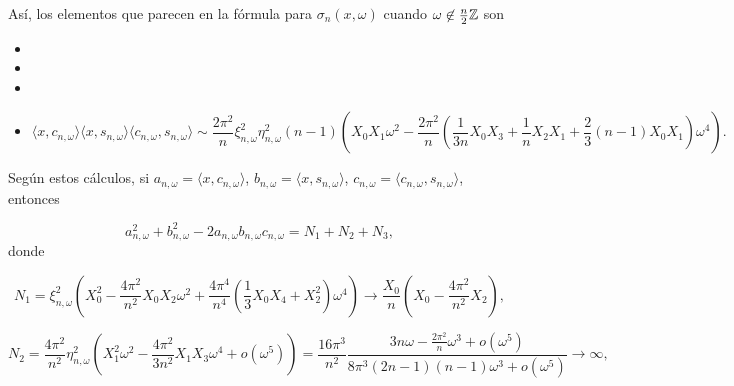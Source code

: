 \TODO{
\[
\langle x,
s_{n, \omega}
\rangle = 
\eta_{n, \omega} 
\left(
\frac{2 \pi}{n} X_{1} \omega - \frac{4 \pi^{3}}{3n^{3}}X_{3} \omega^{3} 
 + o(\omega^{5})
\right),
\]
}

Así, los elementos que parecen en la fórmula
para $\sigma_{n}(x, \omega)$ cuando $\omega \not\in \frac{n}{2} \mathbb{Z}$ son
\begin{itemize}
\item 
{}

\item
\TODO{
\[
\langle x,
c_{n, \omega}
\rangle^{2} = 
\xi_{n, \omega}^{2}
\left(
X_{0}^{2} - \frac{4 \pi^{2}}{n^{2}}X_{0}X_{2} \omega^{2} 
+ 
\frac{4 \pi^{4}}{n^{4}}
\left(
\frac{1}{3} X_{0}X_{4} + X_{2}^{2}
\right) \omega^{4} 
+ o(\omega^{5})
\right)
\]
}

\item
\TODO{
\[
\langle x,
s_{n, \omega}
\rangle^{2} = 
\frac{4 \pi^{2}}{n^{2}}
\eta_{n, \omega}^{2}
\left(
X_{1}^{2}\omega^{2} - \frac{4 \pi^{2}}{3n^{2}}X_{1}X_{3} \omega^{4} 
+  o(\omega^{5})
\right)
\]
}

\item
\[
\langle
x, c_{n, \omega}
\rangle
\langle
x, s_{n, \omega}
\rangle
\langle
c_{n, \omega}, s_{n, \omega}
\rangle \sim
\frac{2 \pi^{2}}{n}
\xi_{n, \omega}^{2} \eta_{n, \omega}^{2}(n-1)
\left(
X_{0}X_{1}\omega^{2} 
- \frac{2 \pi^{2}}{n}
\left(
\frac{1}{3n} X_{0}X_{3} + \frac{1}{n} X_{2}X_{1}
+ \frac{2}{3}(n-1)X_{0}X_{1}
\right) \omega^{4}
\right).
\]
\end{itemize}

Según estos cálculos, si
$a_{n, \omega} = \langle x, c_{n, \omega} \rangle$, 
$b_{n, \omega} = \langle x, s_{n, \omega} \rangle$, 
$c_{n, \omega} = \langle c_{n, \omega}, s_{n, \omega} \rangle$, 
entonces

\[
a_{n, \omega}^{2} + b_{n, \omega}^{2} - 
2a_{n, \omega}b_{n, \omega}c_{n, \omega}
= N_{1} + N_{2} +N_{3},
\]
donde

\[
N_{1} =
\xi_{n, \omega}^{2} \left(
X_{0}^{2} - \frac{4\pi^{2}}{n^{2}} X_{0}X_{2}
\omega^{2} + \frac{4 \pi^{4}}{n^{4}}
\left(
\frac{1}{3} X_{0}X_{4} + X_{2}^{2}
\right) \omega^{4}
\right)
\rightarrow 
\frac{X_{0}}{n}
\left(
X_{0}  - \frac{4 \pi^{2}}{n^{2}}X_{2}
\right),
\]

\[
N_{2} = \frac{4 \pi^{2}}{n^{2}} \eta_{n, \omega}^{2}
\left(
X_{1}^{2} \omega^{2} - \frac{4 \pi^{2}}{3n^{2}}X_{1}X_{3} \omega^{4}
+ o(\omega^{5})
\right)
=
\frac{16 \pi^{3}}{n^{2}}
\frac{3n \omega - \frac{2 \pi^{2}}{n} \omega^{3} + o(\omega^{5})}{
8 \pi^{3}(2n-1)(n-1) \omega^{3} + o(\omega^{5})
}
\rightarrow \infty,
\]

